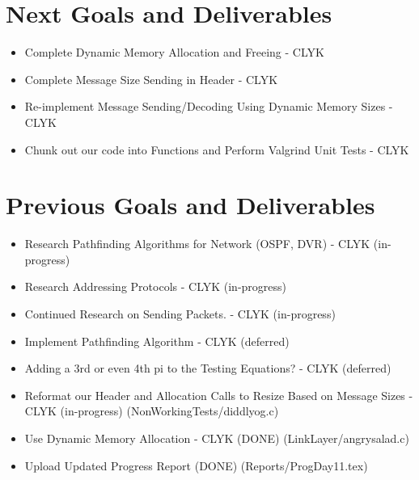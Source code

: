 \documentclass{article}
\begin{document}
\section*{Next Goals and Deliverables}
\begin{itemize}
\item Complete Dynamic Memory Allocation and Freeing - CLYK
\item Complete Message Size Sending in Header - CLYK
\item Re-implement Message Sending/Decoding Using Dynamic Memory Sizes - CLYK
\item Chunk out our code into Functions and Perform Valgrind Unit Tests - CLYK

\end{itemize}
\section*{Previous Goals and Deliverables}
\begin{itemize}
\item Research Pathfinding Algorithms for Network (OSPF, DVR) - CLYK (in-progress)
\item Research Addressing Protocols - CLYK (in-progress)
\item Continued Research on Sending Packets. - CLYK (in-progress)
\item Implement Pathfinding Algorithm - CLYK (deferred)
\item Adding a 3rd or even 4th pi to the Testing Equations? - CLYK (deferred)
\item Reformat our Header and Allocation Calls to Resize Based on Message Sizes - CLYK (in-progress) (NonWorkingTests/diddlyog.c)
\item Use Dynamic Memory Allocation - CLYK (DONE) (LinkLayer/angrysalad.c)
\item Upload Updated Progress Report (DONE) (Reports/ProgDay11.tex)
\end{itemize}
\end{document}
